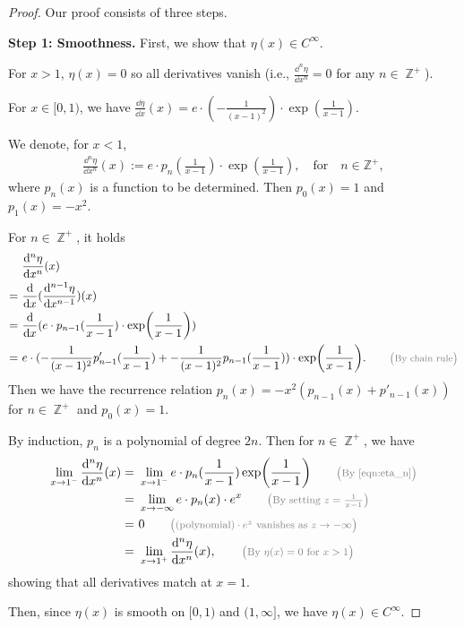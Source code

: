 \documentclass[12pt]{article}
\numberwithin{equation}{section}
\DeclareMathOperator*{\Z}{\mathbb{Z}}
\theoremstyle{theoremstyle}
\numberwithin{equation}{section}
\numberwithin{theorem}{section}
\numberwithin{proposition}{section}
\numberwithin{definition}{section}
\numberwithin{lemma}{section}
\numberwithin{assumption}{section}
\numberwithin{remark}{section}
\newcommand*{\annot}[1]{\tag*{\footnotesize{\textcolor{black!50}{\big(#1\big)}}}}
\begin{document}
\begin{proof} Our proof consists of three steps.

\textbf{Step 1: Smoothness.}
First, we show that $\eta(x)\in C^\infty$.

For $x>1$, $\eta(x)=0$ so all derivatives vanish (i.e., $\frac{\dd^n\eta}{\dd x^n}=0$ for any $n\in\Z^+$). 
    
For $x\in[0,1)$, we have $\frac{\dd\eta}{\dd x}(x)=e\cdot(-\frac{1}{(x-1)^2})\cdot\exp(\frac{1}{x-1})$.

We denote, for $x<1$, 
\begin{align}\label{eqn:eta_n}
    \frac{\dd^n\eta}{\dd x^n}(x) := e\cdot p_n(\frac{1}{x-1})\cdot\exp(\frac{1}{x-1}),\quad\text{for}\quad n\in\mathbb{Z}^+,
\end{align}
where $p_n(x)$ is a function to be determined. 
Then $p_0(x)=1$ and $p_1(x)=-x^2$. 

For $n\in\Z^+$, it holds
\begin{align*}
    & ~ 
    \frac{\dd^n\eta}{\dd x^n}(x)\\
    = & ~
    \frac{\dd}{\dd x}(\frac{\dd^{n-1}\eta}{\dd x^{n-1}})(x) \\
    = & ~
    \frac{\dd}{\dd x}(e\cdot p_{n-1}(\frac{1}{x-1})\cdot\exp(\frac{1}{x-1})) \\
    = & ~
    e\cdot (-\frac{1}{(x-1)^2}p'_{n-1}(\frac{1}{x-1})+-\frac{1}{(x-1)^2}p_{n-1}(\frac{1}{x-1}))\cdot\exp(\frac{1}{x-1}). \annot{By chain rule}
\end{align*}
Then we have the recurrence relation $p_{n}(x)=-x^2(p_{n-1}(x)+p'_{n-1}(x))$ for $n\in\Z^+$ and $p_0(x)=1$.

By induction, $p_n$ is a polynomial of degree $2n$.
Then for $n\in\Z^+$, we have
\begin{align*}
    \lim_{x\to 1^-}\frac{\dd^n\eta}{\dd x^n}(x) 
    = & ~
    \lim_{x\to 1^-} e \cdot p_n (\frac{1}{x-1})\exp(\frac{1}{x-1}) \annot{By \eqref{eqn:eta_n}}\\
    = & ~ 
    \lim_{x\to -\infty}e\cdot p_n(x)\cdot e^{x}
    \annot{By setting $z=\frac{1}{x-1}$}\\
    = & ~  0 
    \annot{$({\rm polynomial})\cdot e^z$ vanishes as $z\to-\infty$}\\
    = & ~ \lim_{x\to 1^+}\frac{\dd^n\eta}{\dd x^n}(x),
    \annot{By $\eta(x)=0$ for $x>1$}
\end{align*}
showing that all derivatives match at $x=1$.  


Then, since $\eta(x)$ is smooth on $[0,1)$ and $(1,\infty]$, we have $\eta(x)\in C^\infty$.


\end{proof}
\end{document}
